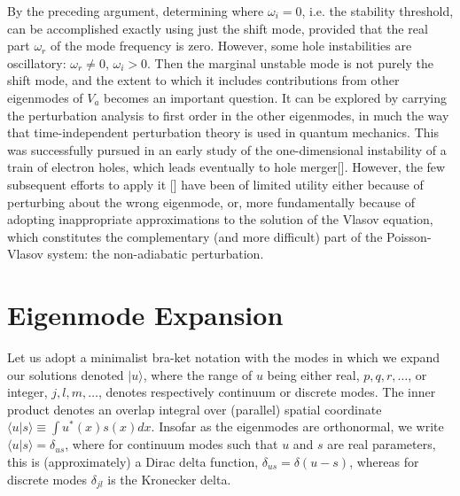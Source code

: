 \documentclass[12pt]{article}
\def\ket#1{|#1\rangle}
\def\bra#1{\langle#1}
\begin{document}
By the preceding argument, determining where $\omega_i=0$, i.e. the
stability threshold, can be accomplished exactly using just the shift
mode, provided that the real part $\omega_r$ of the mode frequency is
zero. However, some hole instabilities are oscillatory:
$\omega_r\not=0$, $\omega_i>0$. Then the marginal unstable mode is not
purely the shift mode, and the extent to which it includes
contributions from other eigenmodes of $V_a$ becomes an important
question. It can be explored by carrying the perturbation analysis to
first order in the other eigenmodes, in much the way that
time-independent perturbation theory is used in quantum
mechanics. This was successfully pursued in an early study of the
one-dimensional instability of a train of electron holes, which leads
eventually to hole merger[]. However, the few subsequent efforts to
apply it [] have been of limited utility either because of perturbing
about the wrong eigenmode, or, more fundamentally because of adopting
inappropriate approximations to the solution of the Vlasov equation,
which constitutes the complementary (and more difficult) part of the
Poisson-Vlasov system: the non-adiabatic perturbation.


\section{Eigenmode Expansion}
Let us adopt a minimalist bra-ket notation with the modes in
which we expand our solutions
denoted $\ket{u}$, where the range of $u$ being either real, $p,q,r,\dots$, or
integer, $j,l,m,\dots$, denotes respectively continuum or discrete modes. The
inner product denotes an overlap integral over (parallel) spatial
coordinate $\bra{u}\ket{s}\equiv \int u^*(x)s(x)dx$. Insofar as the
eigenmodes are orthonormal, we write $\bra{u}\ket{s}=\delta_{us}$,
where for continuum modes such that $u$ and $s$ are real parameters,
this is (approximately) a Dirac delta function,
$\delta_{us}=\delta(u-s)$, whereas for discrete modes $\delta_{jl}$ is
the Kronecker delta.
\end{document}

